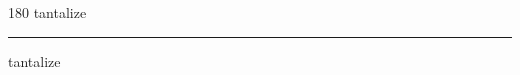
\begin{frame}
\begin{center}
\begin{turn}{180}
{\fontsize{2.5cm}{1em}\selectfont tantalize}
\end{turn}
\vspace{1em}\par  
\hrule
\vspace{1em}\par  
{\fontsize{2.5cm}{1em}\selectfont tantalize}
\end{center}
\end{frame}
